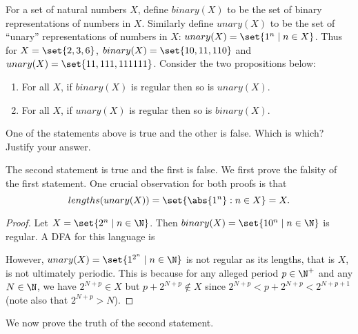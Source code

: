 \documentclass[12pt]{article}
\begin{document}
\begin{problem}
    For a set of natural numbers $X$, define $binary(X)$ to be the set of
    binary representations of numbers in $X$.
    Similarly define $unary(X)$ to be the set of ``unary'' representations
    of numbers in $X$: $unary(X) = \set{1^n \mid n \in X}$.
    Thus for $X = \set{2, 3, 6}$, $binary(X) = \set{10, 11, 110}$ and
    $unary(X) = \set{11, 111, 111111}$.
    Consider the two propositions below:
    \begin{enumerate}[label=(\alph*)]
        \item For all $X$, if $binary(X)$ is regular then so is $unary(X)$.
        \item For all $X$, if $unary(X)$ is regular then so is $binary(X)$.
    \end{enumerate}
    One of the statements above is true and the other is false.
    Which is which?
    Justify your answer.
\end{problem}
The second statement is true and the first is false.
We first prove the falsity of the first statement.
One crucial observation for both proofs is that \[
    lengths(unary(X)) = \set{\abs{1^n} : n \in X} = X.
\]
\begin{proof}
    Let $X = \set{2^n \mid n \in \N}$.
    Then $binary(X) = \set{10^n \mid n \in \N}$ is regular.
    A DFA for this language is
    \begin{center}
    \end{center}
    However, $unary(X) = \set{1^{2^n} \mid n \in \N}$ is not regular as its
    lengths, that is $X$, is not ultimately periodic.
    This is because for any alleged period $p \in \N^+$ and any $N \in \N$,
    we have $2^{N+p} \in X$ but $p + 2^{N+p} \notin X$ since
    $2^{N+p} < p + 2^{N+p} < 2^{N+p+1}$ (note also that $2^{N+p} > N$).
\end{proof}
We now prove the truth of the second statement.
\end{document}
